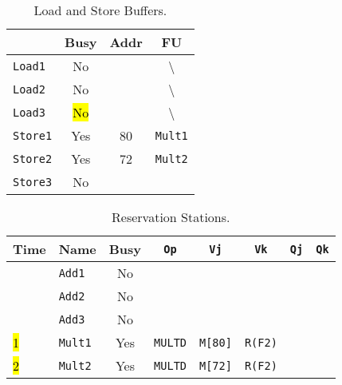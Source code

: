 \begin{enumerate}
    \begin{table}[!htp]
        \centering
        \begin{tabular}{@{} l | c c c @{}}
            \toprule
                                & Busy      & Addr      & FU   \\
            \midrule
            \texttt{Load1}      & No        &           & \textbackslash        \\ [.3em]
            \texttt{Load2}      & No        &           & \textbackslash        \\ [.3em]
            \texttt{Load3}      & \hl{No}   &           & \textbackslash        \\
            \cmidrule{1-4}
            \texttt{Store1}     & Yes       & 80        & \texttt{Mult1}        \\ [.3em]
            \texttt{Store2}     & Yes       & 72        & \texttt{Mult2}        \\ [.3em]
            \texttt{Store3}     & No        &           &                       \\
            \bottomrule
        \end{tabular}
        \caption*{Load and Store Buffers.}
    \end{table}

    \begin{table}[!htp]
        \centering
        \begin{tabular}{@{} l l | c c c c c c @{}}
            \toprule
            Time        & Name              & Busy      & \texttt{Op}           & \texttt{Vj}           & \texttt{Vk}           & \texttt{Qj}           & \texttt{Qk}       \\
            \midrule
                        & \texttt{Add1}     & No        &                       &                       &                       &                       &                   \\ [.3em]
                        & \texttt{Add2}     & No        &                       &                       &                       &                       &                   \\ [.3em]
                        & \texttt{Add3}     & No        &                       &                       &                       &                       &                   \\ [.3em]
            \hl{1}      & \texttt{Mult1}    & Yes       & \texttt{MULTD}        & \texttt{M[80]}        & \texttt{R(F2)}        &                       &                   \\ [.3em]
            \hl{2}      & \texttt{Mult2}    & Yes       & \texttt{MULTD}        & \texttt{M[72]}        & \texttt{R(F2)}        &                       &                   \\
            \bottomrule
        \end{tabular}
        \caption*{Reservation Stations.}
    \end{table}


\end{enumerate}
